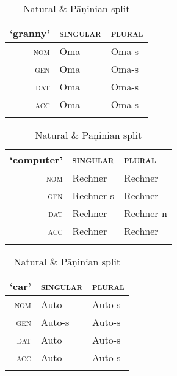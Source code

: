 \documentclass[output=paper,biblatex,babelshorthands,newtxmath,draftmode,colorlinks,citecolor=brown]{langscibook}
\begin{document}
\begin{table}
  \centering
  
  \begin{subtable}{.45\textwidth}
    
    \centering
    \begin{tabular}{r|ll}
      \lsptoprule
      `granny' & \textsc{singular} & \textsc{plural}\\
      \midrule
      \textsc{nom} & Oma & Oma-s\\
      \textsc{gen} & Oma & Oma-s\\
      \textsc{dat} & Oma & Oma-s\\
      \textsc{acc} & Oma & Oma-s\\
      \lspbottomrule
    \end{tabular}

    \caption{Natural split}
  \end{subtable}  
  \begin{subtable}{.50\textwidth}
    
    \centering
    \begin{tabular}{r|ll}
      \lsptoprule
      `computer' & \textsc{singular} & \textsc{plural}\\
      \midrule
      \textsc{nom} & Rechner & Rechner\\
      \textsc{gen} & Rechner-s & Rechner\\
      \textsc{dat} & Rechner & Rechner-n\\
      \textsc{acc} & Rechner & Rechner\\
      \lspbottomrule
    \end{tabular}
    \caption{Pāṇinian split}
  \end{subtable}

  \begin{subtable}{.45\textwidth}
    \centering

    \begin{tabular}{r|ll}
        \lsptoprule
        `car' & \textsc{singular} & \textsc{plural}\\
        \midrule
        \textsc{nom} & Auto & Auto-s\\
        \textsc{gen} & Auto-s & Auto-s\\
        \textsc{dat} & Auto & Auto-s\\
        \textsc{acc} & Auto & Auto-s\\
        \lspbottomrule
      \end{tabular}
      \caption{Natural \& Pāṇinian split}
    \end{subtable}
  \begin{subtable}{.50\textwidth}


\end{subtable}
\end{table}
\end{document}
